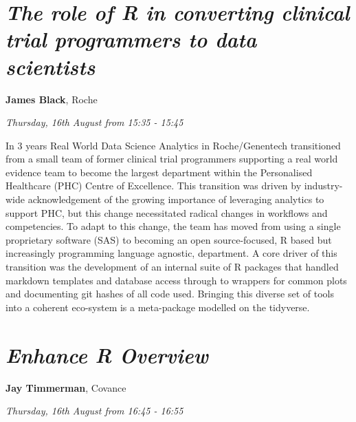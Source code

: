 \documentclass[]{book}
\theoremstyle{definition}
\theoremstyle{definition}
\theoremstyle{definition}
\theoremstyle{remark}
\begin{document}
\hypertarget{the-role-of-r-in-converting-clinical-trial-programmers-to-data-scientists}{%
\section{\texorpdfstring{\emph{The role of R in converting clinical
trial programmers to data
scientists}}{The role of R in converting clinical trial programmers to data scientists}}\label{the-role-of-r-in-converting-clinical-trial-programmers-to-data-scientists}}

\textbf{James Black}, Roche

\emph{Thursday, 16th August from 15:35 - 15:45}

In 3 years Real World Data Science Analytics in Roche/Genentech
transitioned from a small team of former clinical trial programmers
supporting a real world evidence team to become the largest department
within the Personalised Healthcare (PHC) Centre of Excellence. This
transition was driven by industry-wide acknowledgement of the growing
importance of leveraging analytics to support PHC, but this change
necessitated radical changes in workflows and competencies. To adapt to
this change, the team has moved from using a single proprietary software
(SAS) to becoming an open source-focused, R based but increasingly
programming language agnostic, department. A core driver of this
transition was the development of an internal suite of R packages that
handled markdown templates and database access through to wrappers for
common plots and documenting git hashes of all code used. Bringing this
diverse set of tools into a coherent eco-system is a meta-package
modelled on the tidyverse.

\hypertarget{enhance-r-overview}{%
\section{\texorpdfstring{\emph{Enhance R
Overview}}{Enhance R Overview}}\label{enhance-r-overview}}

\textbf{Jay Timmerman}, Covance

\emph{Thursday, 16th August from 16:45 - 16:55}
\end{document}
